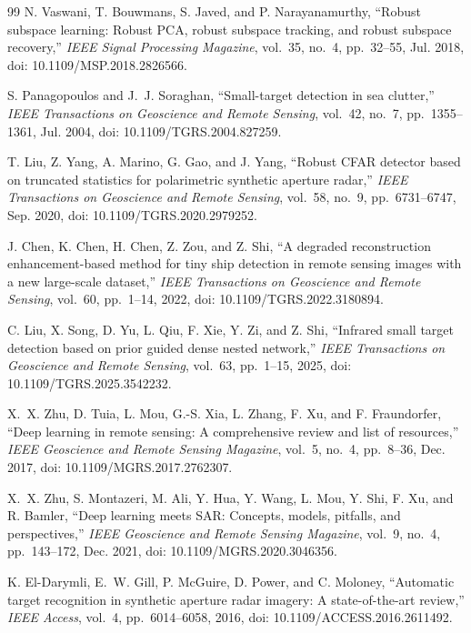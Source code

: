 \documentclass[journal]{IEEEtran}
\begin{document}
\begin{thebibliography}{99}
N. Vaswani, T. Bouwmans, S. Javed, and P. Narayanamurthy, ``Robust subspace learning: Robust PCA, robust subspace tracking, and robust subspace recovery,'' \emph{IEEE Signal Processing Magazine}, vol.~35, no.~4, pp.~32--55, Jul. 2018, doi: 10.1109/MSP.2018.2826566.

S. Panagopoulos and J.~J. Soraghan, ``Small-target detection in sea clutter,'' \emph{IEEE Transactions on Geoscience and Remote Sensing}, vol.~42, no.~7, pp.~1355--1361, Jul. 2004, doi: 10.1109/TGRS.2004.827259.

T. Liu, Z. Yang, A. Marino, G. Gao, and J. Yang, ``Robust CFAR detector based on truncated statistics for polarimetric synthetic aperture radar,'' \emph{IEEE Transactions on Geoscience and Remote Sensing}, vol.~58, no.~9, pp.~6731--6747, Sep. 2020, doi: 10.1109/TGRS.2020.2979252.

J. Chen, K. Chen, H. Chen, Z. Zou, and Z. Shi, ``A degraded reconstruction enhancement-based method for tiny ship detection in remote sensing images with a new large-scale dataset,'' \emph{IEEE Transactions on Geoscience and Remote Sensing}, vol.~60, pp.~1--14, 2022, doi: 10.1109/TGRS.2022.3180894.

C. Liu, X. Song, D. Yu, L. Qiu, F. Xie, Y. Zi, and Z. Shi, ``Infrared small target detection based on prior guided dense nested network,'' \emph{IEEE Transactions on Geoscience and Remote Sensing}, vol.~63, pp.~1--15, 2025, doi: 10.1109/TGRS.2025.3542232.

X.~X. Zhu, D. Tuia, L. Mou, G.-S. Xia, L. Zhang, F. Xu, and F. Fraundorfer, ``Deep learning in remote sensing: A comprehensive review and list of resources,'' \emph{IEEE Geoscience and Remote Sensing Magazine}, vol.~5, no.~4, pp.~8--36, Dec. 2017, doi: 10.1109/MGRS.2017.2762307.

X.~X. Zhu, S. Montazeri, M. Ali, Y. Hua, Y. Wang, L. Mou, Y. Shi, F. Xu, and R. Bamler, ``Deep learning meets SAR: Concepts, models, pitfalls, and perspectives,'' \emph{IEEE Geoscience and Remote Sensing Magazine}, vol.~9, no.~4, pp.~143--172, Dec. 2021, doi: 10.1109/MGRS.2020.3046356.

K. El-Darymli, E.~W. Gill, P. McGuire, D. Power, and C. Moloney, ``Automatic target recognition in synthetic aperture radar imagery: A state-of-the-art review,'' \emph{IEEE Access}, vol.~4, pp.~6014--6058, 2016, doi: 10.1109/ACCESS.2016.2611492.


\end{thebibliography}
\end{document}

